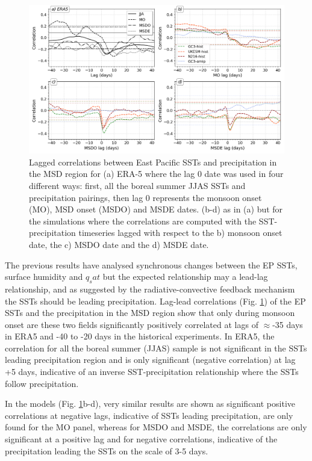 \begin{figure}[t!]
\includegraphics[width=\linewidth]{figures/sst_regg.png}
\caption{Lagged correlations between East Pacific SSTs and precipitation in the MSD region for (a) ERA-5 where the lag 0 date was used in four different ways: first, all the boreal summer JJAS SSTs and precipitation pairings, then lag 0 represents the monsoon onset (MO), MSD onset (MSDO) and MSDE dates. (b-d) as in (a) but for the simulations where the correlations are computed with the SST-precipitation timeseries lagged with respect to the b) monsoon onset date, the c) MSDO date and the d) MSDE date.   }
\label{fig:sst_lag}
\end{figure}

The previous results have analysed synchronous changes between the EP SSTs, surface humidity and $q_sat$ but the expected relationship may a lead-lag relationship, and as suggested by the radiative-convective feedback mechanism the SSTs should be leading precipitation. 
Lag-lead correlations (Fig. \ref{fig:sst_lag}) of the EP SSTs and the precipitation in the MSD region show that only during monsoon onset are these two fields significantly positively correlated at lags of $\approx$-35 days in ERA5 and -40 to -20 days in the historical experiments. In ERA5, the correlation for all the boreal summer (JJAS) sample is not significant in the SSTs leading  precipitation region and is only significant (negative correlation) at lag +5 days, indicative of an inverse SST-precipitation relationship where the SSTs follow precipitation. 

In the models (Fig. \ref{fig:sst_lag}b-d), very similar results are shown as significant positive correlations at negative lags, indicative of SSTs leading precipitation, are only found for the MO panel, whereas for MSDO and MSDE, the correlations are only significant at a positive lag and for negative correlations, indicative of the precipitation leading the SSTs on the scale of 3-5 days.


